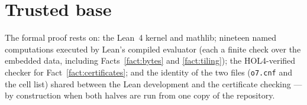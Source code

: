 \documentclass[11pt]{article}
\theoremstyle{plain}
\theoremstyle{definition}
\begin{document}
\section*{Trusted base}
The formal proof rests on: the Lean~4 kernel and mathlib; nineteen named
computations executed by Lean's compiled evaluator (each a finite check over
the embedded data, including Facts~\ref{fact:bytes} and \ref{fact:tiling});
the HOL4-verified checker for Fact~\ref{fact:certificates}; and the identity
of the two files (\texttt{o7.cnf} and the cell list) shared between the Lean
development and the certificate checking --- by construction when both halves
are run from one copy of the repository.
\end{document}
